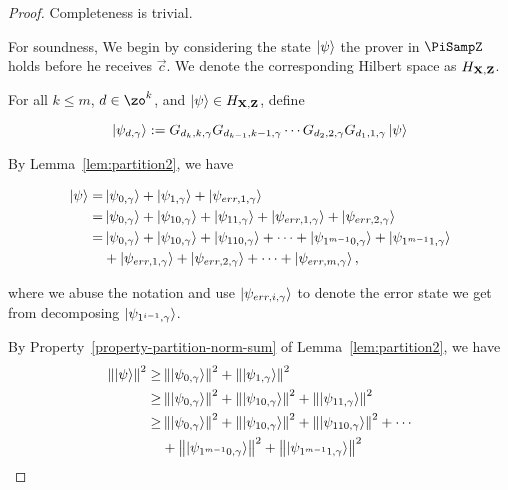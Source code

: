 \begin{proof}

	Completeness is trivial.


	For soundness, We begin by considering the state $\ket{\psi}$ the prover in $\PiSampZ$ holds before he receives $\vec{c}$. We denote the corresponding Hilbert space as $H_{\mathbf{X},\mathbf{Z}}$.

	For all $k\leq m$, $d\in \zo^k$,  and $\ket{\psi} \in H_{\mathbf{X},\mathbf{Z}}$, define

	$$\ket{\psi_{d,\gamma}}:= G_{d_k,k,\gamma}G_{d_{k-1},k-1,\gamma}\cdots G_{d_2,2,\gamma} G_{d_1,1,\gamma} \ket{\psi}$$

	By Lemma~\ref{lem:partition2}, we have  

	\begin{align} \label{eq:partition-string}
		\ket{\psi} =& \ket{\psi_{0,\gamma}}+\ket{\psi_{1,\gamma}}+\ket{\psi_{err,1,\gamma}} \nonumber \\
		=& \ket{\psi_{0,\gamma}}+\ket{\psi_{10,\gamma}}+\ket{\psi_{11,\gamma}}+\ket{\psi_{err,1,\gamma}}+\ket{\psi_{err,2,\gamma}} \nonumber \\
		=& \ket{\psi_{0,\gamma}}+\ket{\psi_{10,\gamma}}+\ket{\psi_{110,\gamma}}+\cdots+\ket{\psi_{1^{m-1}0,\gamma}}+\ket{\psi_{1^{m-1}1,\gamma}} \nonumber \\
		&+\ket{\psi_{err,1,\gamma}}+\ket{\psi_{err,2,\gamma}}+\cdots+\ket{\psi_{err,m,\gamma}},
	\end{align}

	where we abuse the notation and use $\ket{\psi_{err,i,\gamma}}$ to denote the error state we get from decomposing $\ket{\psi_{1^{i-1},\gamma}}$. %

	By Property~\ref{property-partition-norm-sum} of Lemma~\ref{lem:partition2}, we have
	\begin{align} \label{eq:bad-term-sum}
		\left\lVert\ket{\psi}\right\rVert^2 \geq& \left\lVert\ket{\psi_{0,\gamma}}\right\rVert^2+\left\lVert\ket{\psi_{1,\gamma}}\right\rVert^2 \nonumber \\
		\geq& \left\lVert\ket{\psi_{0,\gamma}}\right\rVert^2+
		\left\lVert\ket{\psi_{10,\gamma}}\right\rVert^2+ \left\lVert\ket{\psi_{11,\gamma}}\right\rVert^2 \nonumber \\
		\geq& \left\lVert\ket{\psi_{0,\gamma}}\right\rVert^2+
		\left\lVert\ket{\psi_{10,\gamma}}\right\rVert^2+ \left\lVert\ket{\psi_{110,\gamma}}\right\rVert^2 +\cdots  \nonumber \\
		&+ \left\lVert\ket{\psi_{1^{m-1}0,\gamma}}\right\rVert^2+ \left\lVert\ket{\psi_{1^{m-1}1,\gamma}}\right\rVert^2
	\end{align}


\end{proof}
